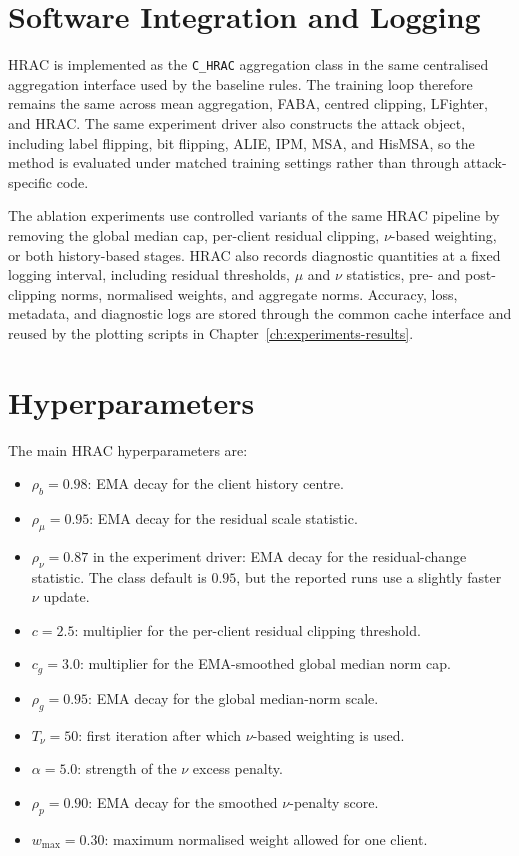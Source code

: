 \section{Software Integration and Logging}
\label{sec:software-integration}

HRAC is implemented as the \texttt{C\_HRAC} aggregation class in the same
centralised aggregation interface used by the baseline rules. The training loop
therefore remains the same across mean aggregation, FABA, centred clipping,
LFighter, and HRAC. The same experiment driver also constructs the attack
object, including label flipping, bit flipping, ALIE, IPM, MSA, and HisMSA, so
the method is evaluated under matched training settings rather than through
attack-specific code.

The ablation experiments use controlled variants of the same HRAC pipeline by
removing the global median cap, per-client residual clipping, $\nu$-based
weighting, or both history-based stages. HRAC also records diagnostic quantities
at a fixed logging interval, including residual thresholds, $\mu$ and $\nu$
statistics, pre- and post-clipping norms, normalised weights, and aggregate
norms. Accuracy, loss, metadata, and diagnostic logs are stored through the
common cache interface and reused by the plotting scripts in
Chapter~\ref{ch:experiments-results}.

\section{Hyperparameters}

The main HRAC hyperparameters are:
\begin{itemize}[leftmargin=*]
    \item $\rho_b=0.98$: EMA decay for the client history centre.
    \item $\rho_\mu=0.95$: EMA decay for the residual scale statistic.
    \item $\rho_\nu=0.87$ in the experiment driver: EMA decay for the
    residual-change statistic. The class default is $0.95$, but the reported
    runs use a slightly faster $\nu$ update.
    \item $c=2.5$: multiplier for the per-client residual clipping threshold.
    \item $c_g=3.0$: multiplier for the EMA-smoothed global median norm cap.
    \item $\rho_g=0.95$: EMA decay for the global median-norm scale.
    \item $T_\nu=50$: first iteration after which $\nu$-based weighting is used.
    \item $\alpha=5.0$: strength of the $\nu$ excess penalty.
    \item $\rho_p=0.90$: EMA decay for the smoothed $\nu$-penalty score.
    \item $w_{\max}=0.30$: maximum normalised weight allowed for one client.
\end{itemize}

